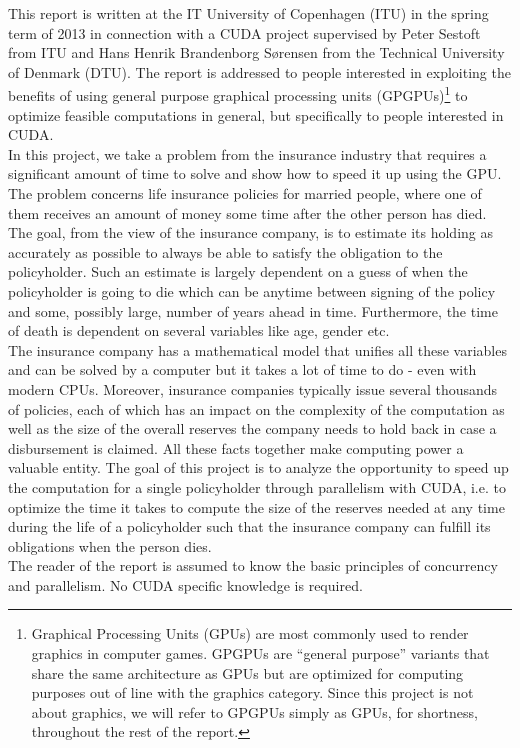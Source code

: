 This report is written at the IT University of Copenhagen (ITU) in the spring term of 2013 in connection with a CUDA project supervised by Peter Sestoft from ITU and Hans Henrik Brandenborg Sørensen from the Technical University of Denmark (DTU). The report is addressed to people interested in exploiting the benefits of using general purpose graphical processing units (GPGPUs)\footnote{Graphical Processing Units (GPUs) are most commonly used to render graphics in computer games. GPGPUs are ``general purpose'' variants that share the same architecture as GPUs but are optimized for computing purposes out of line with the graphics category. Since this project is not about graphics, we will refer to GPGPUs simply as GPUs, for shortness, throughout the rest of the report.} to optimize feasible computations in general, but specifically to people interested in CUDA.\\

In this project, we take a problem from the insurance industry that requires a significant amount of time to solve and show how to speed it up using the GPU. The problem concerns life insurance policies for married people, where one of them receives an amount of money some time after the other person has died. The goal, from the view of the insurance company, is to estimate its holding as accurately as possible to always be able to satisfy the obligation to the policyholder. Such an estimate is largely dependent on a guess of when the policyholder is going to die which can be anytime between signing of the policy and some, possibly large, number of years ahead in time. Furthermore, the time of death is dependent on several variables like age, gender etc. \\

The insurance company has a mathematical model that unifies all these variables and can be solved by a computer but it takes a lot of time to do - even with modern CPUs. Moreover, insurance companies typically issue several thousands of policies, each of which has an impact on the complexity of the computation as well as the size of the overall reserves the company needs to hold back in case a disbursement is claimed. All these facts together make computing power a valuable entity. The goal of this project is to analyze the opportunity to speed up the computation for a single policyholder through parallelism with CUDA, i.e. to optimize the time it takes to compute the size of the reserves needed at any time during the life of a policyholder such that the insurance company can fulfill its obligations when the person dies.\\

The reader of the report is assumed to know the basic principles of concurrency and parallelism. No CUDA specific knowledge is required.